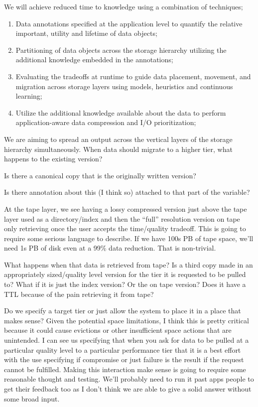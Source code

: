 We will achieve reduced time to knowledge using a combination of techniques;
\begin{enumerate}
\item Data annotations specified at the application level to quantify the
  relative important, utility and lifetime of data objects;
\item Partitioning of data objects across the storage hierarchy utilizing
  the additional knowledge embedded in the annotations;
\item Evaluating the tradeoffs at runtime to guide data placement, movement,
  and migration across storage layers using models, heuristics and continuous
  learning;
\item Utilize the additional knowledge available about the data to perform
  application-aware data compression and I/O prioritization;
\end{enumerate}

We are aiming to spread an output across the vertical layers of the storage
hierarchy simultaneously.  When data should migrate to a higher tier, what
happens to the existing version?

Is there a canonical copy that is the originally written version?

Is there annotation about this (I think so) attached to that part of the variable?

At the tape layer, we see having a lossy compressed version just above the tape
layer used as a directory/index and then the ``full'' resolution version on
tape only retrieving once the user accepts the time/quality tradeoff. This is
going to require some serious language to describe. If we have 100s PB of tape
space, we'll need 1s PB of disk even at a 99\% data reduction. That is
non-trivial.

What happens when that data is retrieved from tape? Is a third copy made in an
appropriately sized/quality level version for the tier it is requested to be
pulled to? What if it is just the index version? Or the on tape version? Does
it have a TTL because of the pain retrieving it from tape?

Do we specify a target tier or just allow the system to place it in a place
that makes sense? Given the potential space limitations, I think this is pretty
critical because it could cause evictions or other insufficient space actions
that are unintended. I can see us specifying that when you ask for data to be
pulled at a particular quality level to a particular performance tier that it
is a best effort with the use specifying if compromise or just failure is the
result if the request cannot be fulfilled.  Making this interaction make sense
is going to require some reasonable thought and testing. We'll probably need to
run it past apps people to get their feedback too as I don't think we are able
to give a solid answer without some broad input.


